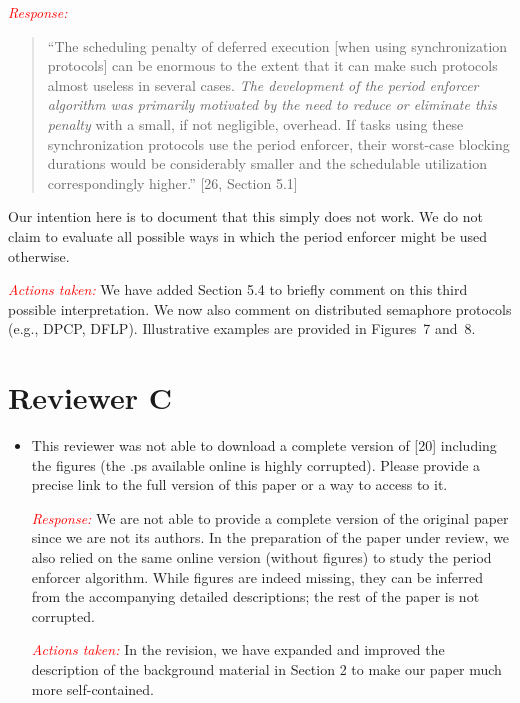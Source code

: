 \documentclass[12pt]{article}
\newenvironment{response}[0]{\textcolor{red}{\emph{Response: }}\color{blue}}{\medskip}
\newcommand{\action}[1]{\textcolor{red}{\emph{\it Actions taken: }}{\color{blue}#1}\medskip}
\begin{document}
\begin{itemize}
\begin{response}
\begin{quote}
	``The scheduling penalty of deferred execution [when using synchronization protocols] can be enormous to the extent that it can make such protocols almost useless in several cases. \emph{The development of the period enforcer algorithm was primarily motivated by the need to reduce or eliminate this penalty} with a small, if not negligible, overhead. If tasks using these synchronization protocols use the period enforcer, their worst-case blocking durations would be considerably smaller and the schedulable utilization correspondingly higher.'' [26, Section 5.1]
\end{quote}


Our intention here is to document that this simply does not work. We do not claim to evaluate all possible ways in which the period enforcer might be used otherwise.
	
\end{response}

\action{We have added Section 5.4 to briefly comment on this third possible interpretation. We now also comment on distributed semaphore protocols (e.g., DPCP, DFLP). Illustrative examples are provided in Figures~7 and~8.}

\end{itemize}


\section*{Reviewer C}

\begin{itemize}
	\item   
This reviewer was not able to download a complete version of [20] including
the figures (the .ps available online is highly corrupted). Please provide a
precise link to the full version of this paper or a way to access to it. 

\begin{response}We are not able to provide a complete version of the original paper since we are not its authors. In the preparation of the paper under review, we also relied on the same online version (without figures) to study the period enforcer algorithm. While figures are indeed missing, they can be inferred from the accompanying detailed  descriptions; the rest of the paper is not corrupted.
	
\end{response}


\action{In the revision, we have expanded and improved the description of the background material in Section 2 to make our paper much more self-contained.}


\end{itemize}
\end{document}
